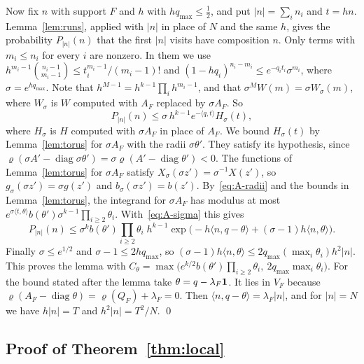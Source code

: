 Now fix $n$ with support $F$ and $h$ with $hq_{\max}\le\frac12$, and put
$\lvert n\rvert=\sum_in_i$ and $t=hn$. Lemma~\ref{lem:runs}, applied with
$\lvert n\rvert$ in place of $N$ and the same $h$, gives the probability
$P_{\lvert n\rvert}(n)$ that the first $\lvert n\rvert$ visits have
composition $n$. Only terms with $m_i\le n_i$ for every $i$ are nonzero. In
them we use $h^{m_i-1}\binom{n_i-1}{m_i-1}\le t_i^{m_i-1}/(m_i-1)!$ and
$(1-hq_i)^{n_i-m_i}\le e^{-q_it_i}\sigma^{m_i}$, where
$\sigma=e^{hq_{\max}}$. Note that $h^{M-1}=h^{k-1}\prod_ih^{m_i-1}$, and
that $\sigma^MW(m)=\sigma W_\sigma(m)$, where $W_\sigma$ is $W$
computed with $A_F$ replaced by $\sigma A_F$. So
\begin{equation}\label{eq:A-sigma}
P_{\lvert n\rvert}(n)\le\sigma\,h^{k-1}e^{-\langle q,t\rangle}H_\sigma(t),
\end{equation}
where $H_\sigma$ is $H$ computed with $\sigma A_F$ in place of $A_F$.
We bound $H_\sigma(t)$ by Lemma~\ref{lem:torus} for $\sigma A_F$ with the
radii $\sigma\theta'$. They satisfy its hypothesis, since
$\varrho(\sigma A'-\operatorname{diag}\sigma\theta')
=\sigma\varrho(A'-\operatorname{diag}\theta')<0$. The functions of
Lemma~\ref{lem:torus} for $\sigma A_F$ satisfy
$X_\sigma(\sigma z')=\sigma^{-1}X(z')$, so
$g_\sigma(\sigma z')=\sigma g(z')$ and
$b_\sigma(\sigma z')=b(z')$. By~\eqref{eq:A-radii} and the bounds in
Lemma~\ref{lem:torus}, the integrand for $\sigma A_F$ has modulus at most
$e^{\sigma\langle t,\theta\rangle}b(\theta')\sigma^{k-1}\prod_{i\ge2}\theta_i$.
With~\eqref{eq:A-sigma} this gives
\[
P_{\lvert n\rvert}(n)\le\sigma^kb(\theta')\prod_{i\ge2}\theta_i\;
h^{k-1}\exp\bigl(-h\langle n,q-\theta\rangle+(\sigma-1)h\langle n,\theta\rangle\bigr).
\]
Finally $\sigma\le e^{1/2}$ and $\sigma-1\le2hq_{\max}$, so
$(\sigma-1)h\langle n,\theta\rangle\le2q_{\max}(\max_i\theta_i)h^2\lvert n\rvert$.
This proves the lemma with
$C_\theta=\max\bigl(e^{k/2}b(\theta')\prod_{i\ge2}\theta_i,\ 2q_{\max}\max_i\theta_i\bigr)$.
For the bound stated after the lemma take
$\theta=q-\lambda_F\mathbf{1}$. It lies in $V_F$ because
$\varrho(A_F-\operatorname{diag}\theta)=\varrho(Q_F)+\lambda_F=0$. Then
$\langle n,q-\theta\rangle=\lambda_F\lvert n\rvert$, and for
$\lvert n\rvert=N$ we have $h\lvert n\rvert=T$ and
$h^2\lvert n\rvert=T^2/N$. \qed

\subsection{Proof of Theorem~\texorpdfstring{\ref{thm:local}}{4.3}}


